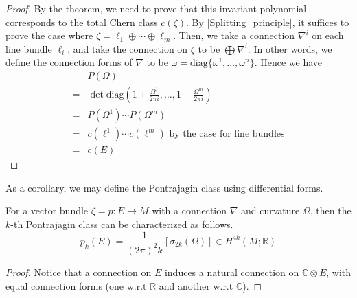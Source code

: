 \begin{proof}
		By the theorem, we need to prove that this invariant polynomial corresponds to the total Chern class $c(\zeta)$. By \cref{Splitting_principle}, it suffices to prove the case where $\zeta=\ell_1\oplus\cdots\oplus\ell_m$. Then, we take a connection $\nabla^i$ on each line bundle $\ell_i$, and take the connection on $\zeta$ to be $\bigoplus\nabla^i$. In other words, we define the connection forms of $\nabla$ to be $\omega=\mathrm{diag}\{\omega^1,\dots,\omega^n\}$. Hence we have
		\begin{align*}
			&P(\Omega) \\
			=&\det\textrm{diag}\left(1+\frac{\Omega^1}{2\pi i},\dots,1+\frac{\Omega^m}{2\pi i}\right) \\
			=&P(\Omega^1)\cdots P(\Omega^m) \\
			=&c(\ell^1)\cdots c(\ell^m) \text{~by~the~case~for~line~bundles} \\
			=&c(E)
		\end{align*}
	\end{proof}
	As a corollary, we may define the Pontrajagin class using differential forms. 
	\begin{coro}
		For a vector bundle $\zeta=p:E\to M$ with a connection $\nabla$ and curvature $\Omega$, then the $k$-th Pontrajagin class can be characterized as follows. 
		\[ p_k(E)=\frac{1}{(2\pi)^2k}[\sigma_{2k}(\Omega)]\in H^{4k}(M;\mathbb{R}) \] 
	\end{coro}
	\begin{proof}
		Notice that a connection on $E$ induces a natural connection on $\mathbb{C}\otimes E$, with equal connection forms (one w.r.t $\mathbb{R}$ and another w.r.t $\mathbb{C}$). 
	\end{proof}

